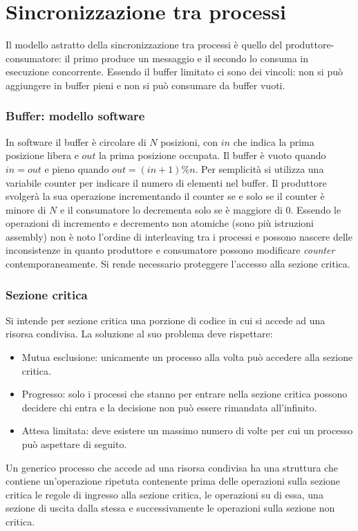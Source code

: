 \chapter{Sincronizzazione tra processi}
Il modello astratto della sincronizzazione tra processi \`e quello del produttore-consumatore: il primo produce un messaggio e il secondo lo consuma in esecuzione concorrente. Essendo il
buffer limitato ci sono dei vincoli: non si pu\`o aggiungere in buffer pieni e non si pu\`o consumare da buffer vuoti.
\subsection{Buffer: modello software}
In software il buffer \`e circolare di $N$ posizioni, con $in$ che indica la prima posizione libera e $out$ la prima posizione occupata. Il buffer \`e vuoto quando $in=out$ e pieno 
quando $out = (in + 1) \% n$. Per semplicit\`a si utilizza una variabile counter per indicare il numero di elementi nel buffer. Il produttore svolger\`a la sua operazione incrementando
il counter se e solo se il counter \`e minore di $N$ e il consumatore lo decrementa solo se \`e maggiore di $0$. Essendo le operazioni di incremento e decremento non atomiche (sono pi\`u
istruzioni assembly) non \`e noto l'ordine di interleaving tra i processi e possono nascere delle inconsistenze in quanto produttore e consumatore possono modificare \emph{counter}
contemporaneamente. Si rende necessario proteggere l'accesso alla sezione critica. 
\subsection{Sezione critica}
Si intende per sezione critica una porzione di codice in cui si accede ad una risorsa condivisa. La soluzione al suo problema deve rispettare:
\begin{itemize}
	\item Mutua esclusione: unicamente un processo alla volta pu\`o accedere alla sezione critica.
	\item Progresso: solo i processi che stanno per entrare nella sezione critica possono decidere chi entra e la decisione non pu\`o essere rimandata all'infinito.
	\item Attesa limitata: deve esistere un massimo numero di volte per cui un processo pu\`o aspettare di seguito.
\end{itemize}
Un generico processo che accede ad una risorsa condivisa ha una struttura che contiene un'operazione ripetuta contenente prima delle operazioni sulla sezione critica le regole di 
ingresso alla sezione critica, le operazioni su di essa, una sezione di uscita dalla stessa e successivamente le operazioni sulla sezione non critica.
